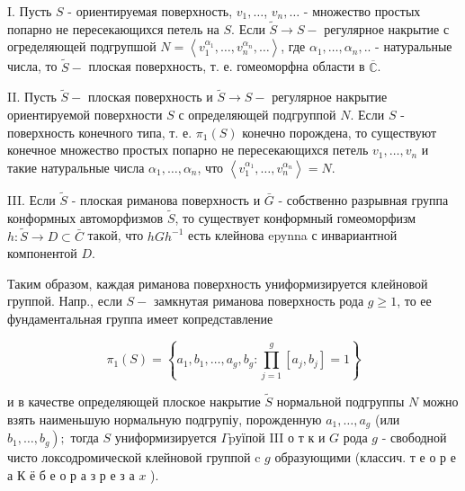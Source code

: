\documentclass[10pt]{article}
\begin{document}
I. Пусть $S$ - ориентируемая поверхность, $v_{1}, \ldots$, $v_{n}, \ldots$ - множество простых попарно не пересекающихся петель на $S$. Если $\widetilde{S} \rightarrow S-$ регулярное накрытие с огределяющей подгрупшой $N=\left\langle v_{1}^{\alpha_{1}}, \ldots, v_{n}^{\alpha_{n}}, \ldots\right\rangle$, где $\alpha_{1}, \ldots, \alpha_{n}, .$. - натуральные числа, то $\widetilde{S}-$ плоская поверхность, т. е. гомеоморфна области в $\overline{\mathbb{C}}$.



II. Пусть $\tilde{S}-$ плоская поверхность и $\tilde{S} \rightarrow S-$ регулярное накрытие ориентируемой поверхности $S$ с определяющей подгруппой $N$. Если $S$ - поверхность конечного типа, т. е. $\pi_{1}(S)$ конечно порождена, то существуют конечное множество простых попарно не пересекающихся петель $v_{1}, \ldots, v_{n}$ и такие натуральные числа $\alpha_{1}, \ldots, \alpha_{n}$, что $\left\langle v_{1}^{\alpha_{1}}, \ldots, v_{n}^{\alpha_{n}}\right\rangle=N$.



III. Если $\tilde{S}$ - плоская риманова поверхность и $\bar{G}$ - собственно разрывная группа конформных автоморфизмов $\tilde{S}$, то существует конформный гомеоморфизм $h: \tilde{S} \rightarrow D \subset \bar{C}$ такой, что $h G h^{-1}$ есть клейнова epynna с инвариантной компонентой $D$.



Таким образом, каждая риманова поверхность униформизируется клейновой группой. Напр., если $S-$ замкнутая риманова поверхность рода $g \geqslant 1$, то ее фундаментальная группа имеет копредставление



\[

\pi_{1}(S)=\left\{a_{1}, b_{1}, \ldots, a_{g}, b_{g}: \prod_{j=1}^{g}\left[a_{j}, b_{j}\right]=1\right\}

\]



и в качестве определяющей плоское накрытие $\tilde{S}$ нормальной подгруппы $N$ можно взять наименьшую нормальную подгрупіу, порожденную $a_{1}, \ldots, a_{g}$ (или $\left.b_{1}, \ldots, b_{g}\right) ;$ тогда $S$ униформизируется $\Gamma \mathrm{p} \mathrm{у} \mathrm{ї} \mathrm{по} \mathrm{й}$ III о т к и $G$ рода $g$ - свободной чисто локсодромической клейновой группой c $g$ образующими (классич. т е о р е а $К$ ё б е о р а з р е з а $x$ ).
\end{document}
